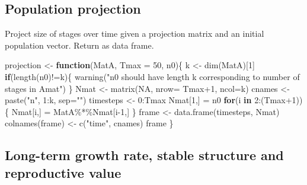 \documentclass[
]{book}
\newenvironment{Shaded}{\begin{snugshade}}{\end{snugshade}}
\newcommand{\AttributeTok}[1]{\textcolor[rgb]{0.77,0.63,0.00}{#1}}
\newcommand{\ConstantTok}[1]{\textcolor[rgb]{0.00,0.00,0.00}{#1}}
\newcommand{\ControlFlowTok}[1]{\textcolor[rgb]{0.13,0.29,0.53}{\textbf{#1}}}
\newcommand{\DecValTok}[1]{\textcolor[rgb]{0.00,0.00,0.81}{#1}}
\newcommand{\FunctionTok}[1]{\textcolor[rgb]{0.00,0.00,0.00}{#1}}
\newcommand{\NormalTok}[1]{#1}
\newcommand{\OtherTok}[1]{\textcolor[rgb]{0.56,0.35,0.01}{#1}}
\newcommand{\SpecialCharTok}[1]{\textcolor[rgb]{0.00,0.00,0.00}{#1}}
\newcommand{\StringTok}[1]{\textcolor[rgb]{0.31,0.60,0.02}{#1}}
\begin{document}
\hypertarget{population-projection}{%
\subsection{Population projection}\label{population-projection}}

Project size of stages over time given a projection matrix and an initial population vector. Return as data frame.

\begin{Shaded}
\begin{Highlighting}[]
\NormalTok{projection }\OtherTok{\textless{}{-}} \ControlFlowTok{function}\NormalTok{(MatA, }\AttributeTok{Tmax =} \DecValTok{50}\NormalTok{, n0)\{}
\NormalTok{  k }\OtherTok{\textless{}{-}} \FunctionTok{dim}\NormalTok{(MatA)[}\DecValTok{1}\NormalTok{]}
  \ControlFlowTok{if}\NormalTok{(}\FunctionTok{length}\NormalTok{(n0)}\SpecialCharTok{!=}\NormalTok{k)\{}
      \FunctionTok{warning}\NormalTok{(}\StringTok{"n0 should have length k corresponding to number of stages in Amat"}\NormalTok{)}
\NormalTok{      \}}
\NormalTok{  Nmat }\OtherTok{\textless{}{-}} \FunctionTok{matrix}\NormalTok{(}\ConstantTok{NA}\NormalTok{, }\AttributeTok{nrow=}\NormalTok{ Tmax}\SpecialCharTok{+}\DecValTok{1}\NormalTok{, }\AttributeTok{ncol=}\NormalTok{k)}
\NormalTok{  cnames }\OtherTok{\textless{}{-}} \FunctionTok{paste}\NormalTok{(}\StringTok{"n"}\NormalTok{, }\DecValTok{1}\SpecialCharTok{:}\NormalTok{k, }\AttributeTok{sep=}\StringTok{""}\NormalTok{)}
\NormalTok{  timesteps }\OtherTok{\textless{}{-}} \DecValTok{0}\SpecialCharTok{:}\NormalTok{Tmax}
\NormalTok{  Nmat[}\DecValTok{1}\NormalTok{,] }\OtherTok{=}\NormalTok{ n0 }
  \ControlFlowTok{for}\NormalTok{(i }\ControlFlowTok{in} \DecValTok{2}\SpecialCharTok{:}\NormalTok{(Tmax}\SpecialCharTok{+}\DecValTok{1}\NormalTok{))\{  }
\NormalTok{    Nmat[i,] }\OtherTok{=}\NormalTok{ MatA}\SpecialCharTok{\%*\%}\NormalTok{Nmat[i}\DecValTok{{-}1}\NormalTok{,]}
\NormalTok{  \}}
\NormalTok{  frame }\OtherTok{\textless{}{-}} \FunctionTok{data.frame}\NormalTok{(timesteps, Nmat)}
  \FunctionTok{colnames}\NormalTok{(frame) }\OtherTok{\textless{}{-}} \FunctionTok{c}\NormalTok{(}\StringTok{"time"}\NormalTok{, cnames)}
\NormalTok{  frame}
\NormalTok{\}}
\end{Highlighting}
\end{Shaded}

\hypertarget{long-term-growth-rate-stable-structure-and-reproductive-value}{%
\subsection{Long-term growth rate, stable structure and reproductive value}\label{long-term-growth-rate-stable-structure-and-reproductive-value}}
\end{document}
